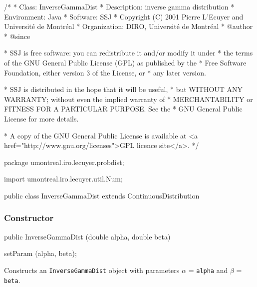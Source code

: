 \begin{code}
\begin{hide}
/*
 * Class:        InverseGammaDist
 * Description:  inverse gamma distribution
 * Environment:  Java
 * Software:     SSJ 
 * Copyright (C) 2001  Pierre L'Ecuyer and Université de Montréal
 * Organization: DIRO, Université de Montréal
 * @author       
 * @since

 * SSJ is free software: you can redistribute it and/or modify it under
 * the terms of the GNU General Public License (GPL) as published by the
 * Free Software Foundation, either version 3 of the License, or
 * any later version.

 * SSJ is distributed in the hope that it will be useful,
 * but WITHOUT ANY WARRANTY; without even the implied warranty of
 * MERCHANTABILITY or FITNESS FOR A PARTICULAR PURPOSE.  See the
 * GNU General Public License for more details.

 * A copy of the GNU General Public License is available at
   <a href="http://www.gnu.org/licenses">GPL licence site</a>.
 */
\end{hide}
package umontreal.iro.lecuyer.probdist;
\begin{hide}
import umontreal.iro.lecuyer.util.Num;
\end{hide}

public class InverseGammaDist extends ContinuousDistribution\begin{hide} {
   protected double alpha;
   protected double beta;
   protected double logam;   // Ln (Gamma(alpha))

\end{hide}\end{code}
\subsubsection* {Constructor}

\begin{code}

   public InverseGammaDist (double alpha, double beta)\begin{hide} {
      setParam (alpha, beta);
   }\end{hide}
\end{code}
\begin{tabb}
   Constructs an \texttt{InverseGammaDist} object with parameters
   $\alpha$ = \texttt{alpha} and $\beta$ = \texttt{beta}.
\end{tabb}

